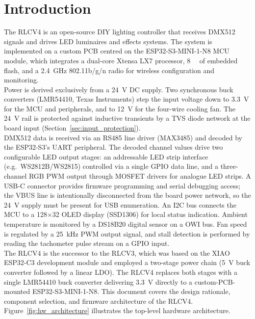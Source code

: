 \section{Introduction}
\label{sec:introduction}

The RLCV4 is an open-source DIY lighting controller that receives \ac{DMX}512 signals and drives \ac{LED} luminaires and effects systems.
The system is implemented on a custom \ac{PCB} centred on the ESP32-S3-MINI-1-N8 \ac{MCU} module, which integrates a dual-core Xtensa LX7 processor, \SI{8}{\mega\byte} of embedded flash, and a \SI{2.4}{\giga\hertz} 802.11b/g/n radio for wireless configuration and monitoring. \\

Power is derived exclusively from a \SI{24}{\volt} \ac{DC} supply.
Two synchronous buck converters (LMR54410, Texas Instruments) step the input voltage down to \SI{3.3}{\volt} for the \ac{MCU} and peripherals, and to \SI{12}{\volt} for the four-wire cooling fan.
The \SI{24}{\volt} rail is protected against inductive transients by a \ac{TVS} diode network at the board input (Section~\ref{sec:input_protection}). \\

\ac{DMX}512 data is received via an \ac{RS485} line driver (MAX3485) and decoded by the ESP32-S3's \ac{UART} peripheral.
The decoded channel values drive two configurable \ac{LED} output stages: an addressable \ac{LED} strip interface (e.g.\ WS2812B/WS2815) controlled via a single \ac{GPIO} data line, and a three-channel \ac{RGB} \ac{PWM} output through \ac{MOSFET} drivers for analogue \ac{LED} strips.
A \ac{USB}-C connector provides firmware programming and serial debugging access; the VBUS line is intentionally disconnected from the board power network, so the \SI{24}{\volt} supply must be present for \ac{USB} enumeration.
An \ac{I2C} bus connects the \ac{MCU} to a 128$\times$32 \ac{OLED} display (SSD1306) for local status indication.
Ambient temperature is monitored by a DS18B20 digital sensor on a \ac{OWI} bus.
Fan speed is regulated by a \SI{25}{\kilo\hertz} \ac{PWM} output signal, and stall detection is performed by reading the tachometer pulse stream on a \ac{GPIO} input. \\

The RLCV4 is the successor to the RLCV3, which was based on the XIAO ESP32-C3 development module and employed a two-stage power chain (\SI{5}{\volt} buck converter followed by a linear \ac{LDO}).
The RLCV4 replaces both stages with a single LMR54410 buck converter delivering \SI{3.3}{\volt} directly to a custom-\ac{PCB}-mounted ESP32-S3-MINI-1-N8.
This document covers the design rationale, component selection, and firmware architecture of the RLCV4.
Figure~\ref{fig:hw_architecture} illustrates the top-level hardware architecture.
